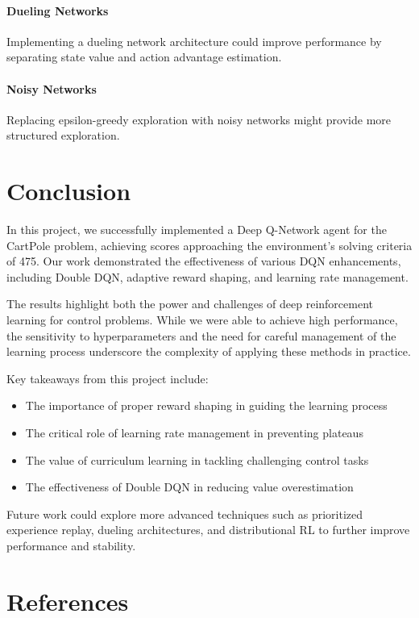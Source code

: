\documentclass[11pt,a4paper]{article}
\begin{document}
\paragraph{Dueling Networks}
Implementing a dueling network architecture could improve performance by separating state value and action advantage estimation.

\paragraph{Noisy Networks}
Replacing epsilon-greedy exploration with noisy networks might provide more structured exploration.

\section{Conclusion}

In this project, we successfully implemented a Deep Q-Network agent for the CartPole problem, achieving scores approaching the environment's solving criteria of 475. Our work demonstrated the effectiveness of various DQN enhancements, including Double DQN, adaptive reward shaping, and learning rate management.

The results highlight both the power and challenges of deep reinforcement learning for control problems. While we were able to achieve high performance, the sensitivity to hyperparameters and the need for careful management of the learning process underscore the complexity of applying these methods in practice.

Key takeaways from this project include:

\begin{itemize}
    \item The importance of proper reward shaping in guiding the learning process
    \item The critical role of learning rate management in preventing plateaus
    \item The value of curriculum learning in tackling challenging control tasks
    \item The effectiveness of Double DQN in reducing value overestimation
\end{itemize}

Future work could explore more advanced techniques such as prioritized experience replay, dueling architectures, and distributional RL to further improve performance and stability.

\section{References}
\end{document}

